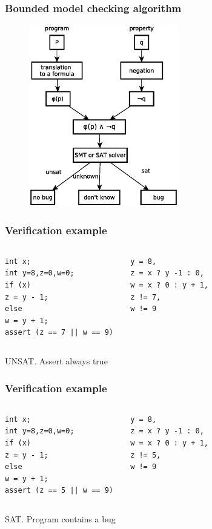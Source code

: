\begin{frame}
\frametitle{Bounded model checking algorithm}
	\begin{figure}
	\includegraphics[width=65mm]{image/BMC}
	\end{figure}	
\end{frame}


\begin{frame}[fragile]\frametitle{Verification example} 
\center 
\begin{columns} 
\begin{lstlisting}[style=crs_cpp] 
int x; 
int y=8,z=0,w=0; 
if (x) 
z = y - 1; 
else 
w = y + 1; 
assert (z == 7 || w == 9) 
\end{lstlisting} 
\begin{lstlisting}[style = crs_llvm] 
y = 8, 
z = x ? y -1 : 0, 
w = x ? 0 : y + 1, 
z != 7, 
w != 9 
\end{lstlisting} 
\end{columns} 
	\begin{block}{}
	\centering
UNSAT. Assert always true
	\end{block}
\end{frame} 




\begin{frame}[fragile]\frametitle{Verification example} 
\center 
\begin{columns} 
\begin{lstlisting}[style=crs_cpp] 
int x; 
int y=8,z=0,w=0; 
if (x) 
z = y - 1; 
else 
w = y + 1; 
assert (z == 5 || w == 9) 
\end{lstlisting} 
\begin{lstlisting}[style = crs_llvm] 
y = 8, 
z = x ? y -1 : 0, 
w = x ? 0 : y + 1, 
z != 5, 
w != 9 
\end{lstlisting} 
\end{columns} 
	\begin{block}{}
	\centering
SAT. Program contains a bug
	\end{block}
\end{frame}


